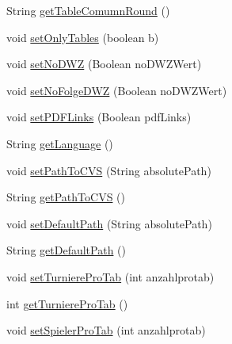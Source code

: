 \begin{DoxyCompactItemize}
\item 
String \hyperlink{classde_1_1turnierverwaltung_1_1control_1_1_properties_control_a7176dd21da1a1a9d6096a060d321523b}{get\+Table\+Comumn\+Round} ()
\item 
void \hyperlink{classde_1_1turnierverwaltung_1_1control_1_1_properties_control_a2163116e61e2c2fb90f78b3fb384ede2}{set\+Only\+Tables} (boolean b)
\item 
void \hyperlink{classde_1_1turnierverwaltung_1_1control_1_1_properties_control_aece393dfce8d5d010eaf9c683ad057de}{set\+No\+D\+WZ} (Boolean no\+D\+W\+Z\+Wert)
\item 
void \hyperlink{classde_1_1turnierverwaltung_1_1control_1_1_properties_control_a79dec093496a9b170d5e464d25bd7e43}{set\+No\+Folge\+D\+WZ} (Boolean no\+D\+W\+Z\+Wert)
\item 
void \hyperlink{classde_1_1turnierverwaltung_1_1control_1_1_properties_control_a7ebbb39b84098ff53eea1d419da815a5}{set\+P\+D\+F\+Links} (Boolean pdf\+Links)
\item 
String \hyperlink{classde_1_1turnierverwaltung_1_1control_1_1_properties_control_a4c98dfc5ab5c530084de90f3aa930269}{get\+Language} ()
\item 
void \hyperlink{classde_1_1turnierverwaltung_1_1control_1_1_properties_control_a0ffc0eeaa51da4cf80bed12b9966509a}{set\+Path\+To\+C\+VS} (String absolute\+Path)
\item 
String \hyperlink{classde_1_1turnierverwaltung_1_1control_1_1_properties_control_a92574e952fde5e06826d328a8dce6a67}{get\+Path\+To\+C\+VS} ()
\item 
void \hyperlink{classde_1_1turnierverwaltung_1_1control_1_1_properties_control_a8d4678a30c19c2903f54b62777024ff1}{set\+Default\+Path} (String absolute\+Path)
\item 
String \hyperlink{classde_1_1turnierverwaltung_1_1control_1_1_properties_control_ac2b3b0032dcf902605d58d2817a18d3a}{get\+Default\+Path} ()
\item 
void \hyperlink{classde_1_1turnierverwaltung_1_1control_1_1_properties_control_ac760960e291af6b5f0a178efb0ba78ad}{set\+Turniere\+Pro\+Tab} (int anzahlprotab)
\item 
int \hyperlink{classde_1_1turnierverwaltung_1_1control_1_1_properties_control_a18743e1bf4bf916fc0cf55d49caaad98}{get\+Turniere\+Pro\+Tab} ()
\item 
void \hyperlink{classde_1_1turnierverwaltung_1_1control_1_1_properties_control_a087336f9d202a7471b80beebc2305687}{set\+Spieler\+Pro\+Tab} (int anzahlprotab)
\item 

\end{DoxyCompactItemize}
